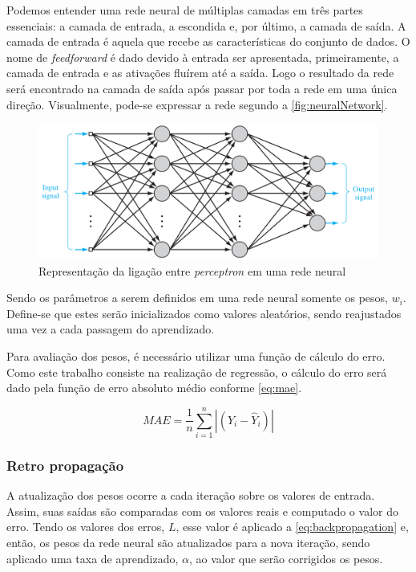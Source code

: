 \documentclass[
    12pt,
    oneside,
    a4paper,
    english,
    brazil
]{abntex2}
\begin{document}
Podemos  entender  uma  rede  neural   de  múltiplas  camadas  em  três  partes
essenciais: a camada  de entrada, a escondida e, por último, a camada de saída.
A camada  de entrada é aquela que recebe as  características do conjunto de
dados. O nome  de \textit{feedforward} é dado devido à  entrada ser apresentada,
primeiramente, a camada  de entrada e as  ativações fluírem até a  saída. Logo o
resultado da  rede será encontrado  na camada de saída  após passar por  toda a
rede  em uma  única direção.  Visualmente, pode-se  expressar a  rede segundo  a
\autoref{fig:neuralNetwork}.

\begin{figure}[ht]
    \centering
    \caption{Representação da ligação entre \textit{perceptron} em uma rede
    neural}\label{fig:neuralNetwork}
    \includegraphics[width=.5\linewidth]{images/neuralNetwork.png}
\end{figure}

Sendo os  parâmetros a  serem definidos  em uma rede  neural somente  os pesos,
$w_i$. Define-se que  estes serão inicializados como  valores aleatórios, sendo
reajustados uma vez a cada passagem do aprendizado.

Para avaliação dos pesos, é necessário utilizar uma função  de cálculo do erro.
Como este trabalho consiste na realização de regressão, o cálculo do erro será dado
pela função de erro absoluto médio conforme \autoref{eq:mae}.

\begin{equation}\label{eq:mae}
    MAE = \frac{1}{n}\sum_{i=1}^{n}{|(Y_i - \hat{Y}_i)|}
\end{equation}

\subsubsection{Retro propagação}

A atualização  dos pesos ocorre  a cada iteração  sobre os valores  de entrada.
Assim,  suas  saídas  são  comparadas  com  os  valores  reais  e  computado  o
valor  do erro.  Tendo os  valores  dos erros,  $L$,  esse valor  é aplicado  a
\autoref{eq:backpropagation} e, então, os pesos  da rede neural  são atualizados
para a  nova iteração,  sendo aplicado  uma taxa  de aprendizado,  $\alpha$, ao
valor que serão corrigidos os pesos.
\end{document}
